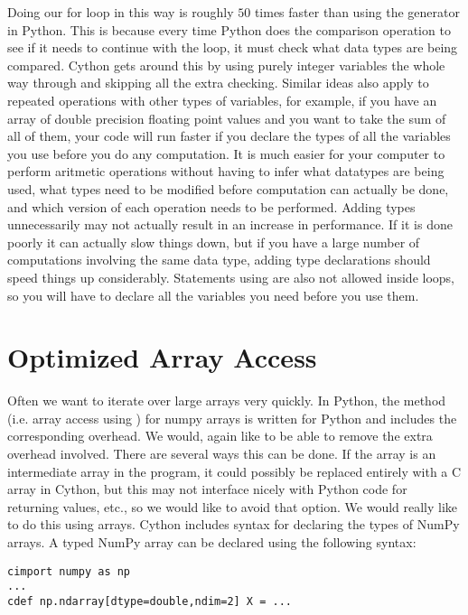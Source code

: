 Doing our for loop in this way is roughly $50$ times faster than using the generator in Python.
This is because every time Python does the comparison operation to see if it needs to continue with the loop, it must check what data types are being compared.
Cython gets around this by using purely integer variables the whole way through and skipping all the extra checking.
Similar ideas also apply to repeated operations with other types of variables, for example, if you have an array of double precision floating point values and you want to take the sum of all of them, your code will run faster if you declare the types of all the variables you use before you do any computation.
It is much easier for your computer to perform aritmetic operations without having to infer what datatypes are being used, what types need to be modified before computation can actually be done, and which version of each operation needs to be performed.
Adding types unnecessarily may not actually result in an increase in performance. If it is done poorly it can actually slow things down, but if you have a large number of computations involving the same data type, adding type declarations should speed things up considerably.
Statements using  are also not allowed inside loops, so you will have to declare all the variables you need before you use them.

\section*{Optimized Array Access}

Often we want to iterate over large arrays very quickly.
In Python, the  method (i.e. array access using \li{[ ]}) for numpy arrays is written for Python and includes the corresponding overhead.
We would, again like to be able to remove the extra overhead involved.
There are several ways this can be done.
If the array is an intermediate array in the program, it could possibly be replaced entirely with a C array in Cython, but this may not interface nicely with Python code for returning values, etc., so we would like to avoid that option.
We would really like to do this using arrays.
Cython includes syntax for declaring the types of NumPy arrays.
A typed NumPy array can be declared using the following syntax:
\begin{lstlisting}
cimport numpy as np
...
cdef np.ndarray[dtype=double,ndim=2] X = ...
\end{lstlisting}

